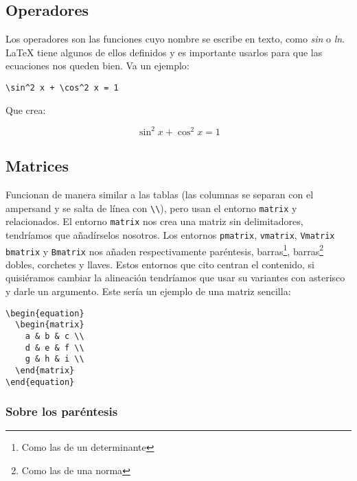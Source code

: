 \subsection{Operadores}\label{sec:operadores}

Los operadores son las funciones cuyo nombre se escribe en texto, como
\emph{sin} o \emph{ln}. LaTeX tiene algunos de ellos definidos y es
importante usarlos para que las ecuaciones nos queden bien. Va un
ejemplo:

\begin{lstlisting}[language={[latex]tex}]
\sin^2 x + \cos^2 x = 1
\end{lstlisting}

Que crea: 

\begin{equation*}
\sin^2 x + \cos^2 x = 1 
\end{equation*}

\subsection{Matrices}\label{sec:matrices}

Funcionan de manera similar a las tablas (las columnas se separan con el
ampersand y se salta de línea con \lstinline!\\!), pero usan el entorno
\lstinline!matrix! y relacionados. El entorno \lstinline!matrix! nos
crea una matriz sin delimitadores, tendríamos que añadírselos nosotros.
Los entornos \lstinline!pmatrix!, \lstinline!vmatrix!,
\lstinline!Vmatrix! \lstinline!bmatrix! y \lstinline!Bmatrix! nos añaden
respectivamente paréntesis, barras\footnote{Como las de un determinante},
barras\footnote{Como las de una norma} dobles, corchetes y llaves. Estos
entornos que cito centran el contenido, si quisiéramos cambiar la
alineación tendríamos que usar su variantes con asterisco y darle un
argumento. Este sería un ejemplo de una matriz sencilla:

\begin{lstlisting}[language={[latex]tex}]
\begin{equation}
  \begin{matrix}
    a & b & c \\
    d & e & f \\
    g & h & i \\
  \end{matrix}
\end{equation}
\end{lstlisting}

\subsubsection{Sobre los paréntesis}\label{sec:parentesis}

